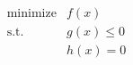 \[
\begin{array}{cl}
\text{minimize} & f(x) \\
\text{s.t.} & g(x) \leq 0 \\
& h(x) = 0 
\end{array}
\]
